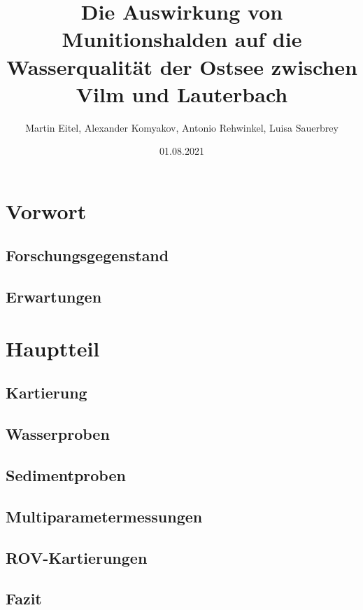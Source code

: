 \documentclass[12pt,titlepage]{scrbook}
\begin{document}
\begin{titlepage}
\title{Die Auswirkung von Munitionshalden auf die Wasserqualität der Ostsee zwischen Vilm und Lauterbach}
\date{01.08.2021}
\author{Martin Eitel, Alexander Komyakov, Antonio Rehwinkel, Luisa Sauerbrey}
\maketitle
\end{titlepage}
\tableofcontents
\chapter{Vorwort}
\section{Forschungsgegenstand}
\section{Erwartungen}
\chapter{Hauptteil}
\section{Kartierung}
\section{Wasserproben}
\section{Sedimentproben}
\section{Multiparametermessungen}
\section{ROV-Kartierungen}
\section{Fazit}
\end{document}
